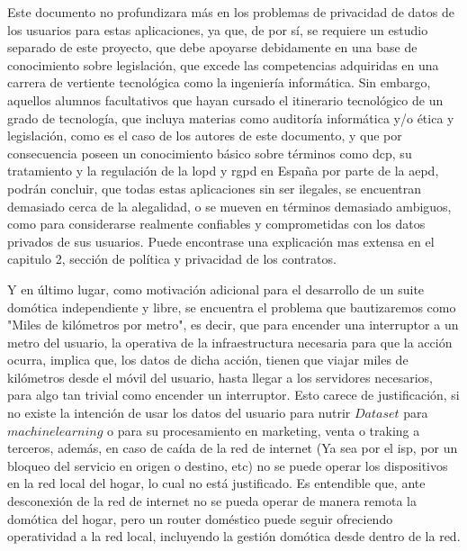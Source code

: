 \vspace{1cm}

Este documento no profundizara más en los problemas de privacidad de datos de los usuarios para estas aplicaciones, ya que, de por sí, se requiere un estudio separado de este proyecto, que debe apoyarse debidamente en una base de conocimiento sobre legislación, que excede las competencias adquiridas en una carrera de vertiente tecnológica como la ingeniería informática. Sin embargo, aquellos alumnos facultativos que hayan cursado el itinerario tecnológico de un grado de tecnología, que incluya materias como auditoría informática y/o ética y legislación, como es el caso de los autores de este documento, y que por consecuencia poseen un conocimiento básico sobre términos como \gls{dcp}, su tratamiento y la regulación de la \gls{lopd} y \gls{rgpd} en España por parte de la \gls{aepd}, podrán concluir, que todas estas aplicaciones sin ser ilegales, se encuentran demasiado cerca de la alegalidad, o se mueven en términos demasiado ambiguos, como para considerarse realmente confiables y comprometidas con los datos privados de sus usuarios. Puede encontrase una explicación mas extensa en el capitulo 2, sección de política y privacidad de los contratos.

\vspace{1cm}

Y en último lugar, como motivación adicional para el desarrollo de un suite domótica independiente y libre, se encuentra el problema que bautizaremos como "Miles de kilómetros por metro", es decir, que para encender una interruptor a un metro del usuario, la operativa de la infraestructura necesaria para que la acción ocurra, implica que, los datos de dicha acción, tienen que viajar miles de kilómetros desde el móvil del usuario, hasta llegar a los servidores necesarios, para algo tan trivial como encender un interruptor. Esto carece de justificación, si no existe la intención de usar los datos del usuario para nutrir $Dataset$ para $machine learning$ o para su procesamiento en marketing, venta o traking a terceros, además, en caso de caída de la red de internet (Ya sea por el \gls{isp}, por un bloqueo del servicio en origen o destino, etc) no se puede operar los dispositivos en la red local del hogar, lo cual no está justificado. Es entendible que, ante desconexión de la red de internet no se pueda operar de manera remota la domótica del hogar, pero un router doméstico puede seguir ofreciendo operatividad a la red local, incluyendo la gestión domótica desde dentro de la red.

